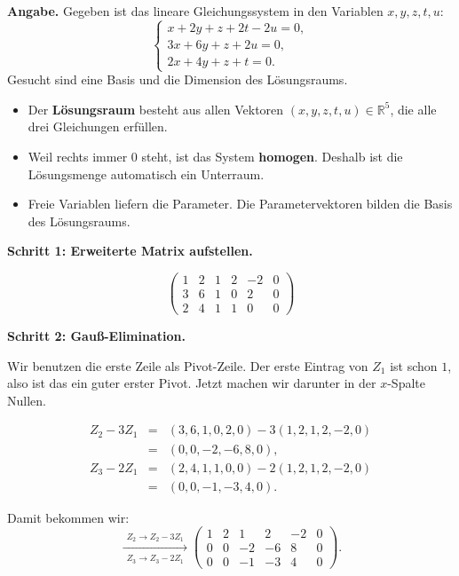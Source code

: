 \documentclass[a4paper,12pt]{article}
\begin{document}
\textbf{Angabe.}
Gegeben ist das lineare Gleichungssystem in den Variablen $x,y,z,t,u$:
\[
\begin{cases}
x+2y+z+2t-2u=0,\\
3x+6y+z+2u=0,\\
2x+4y+z+t=0.
\end{cases}
\]
Gesucht sind eine Basis und die Dimension des L\"osungsraums.

\begin{begriffe}
\begin{itemize}[leftmargin=*, nosep]
    \item Der \textbf{L\"osungsraum} besteht aus allen Vektoren $(x,y,z,t,u)\in\mathbb{R}^5$, die alle drei Gleichungen erf\"ullen.
    \item Weil rechts immer $0$ steht, ist das System \textbf{homogen}. Deshalb ist die L\"osungsmenge automatisch ein Unterraum.
    \item Freie Variablen liefern die Parameter. Die Parametervektoren bilden die Basis des L\"osungsraums.
\end{itemize}
\end{begriffe}

\textbf{Schritt 1: Erweiterte Matrix aufstellen.}

\[
\left(\begin{array}{ccccc|c}
1 & 2 & 1 & 2 & -2 & 0 \\
3 & 6 & 1 & 0 & 2 & 0 \\
2 & 4 & 1 & 1 & 0 & 0
\end{array}\right)
\]

\textbf{Schritt 2: Gau\ss-Elimination.}

Wir benutzen die erste Zeile als Pivot-Zeile. Der erste Eintrag von $Z_1$ ist schon $1$,
also ist das ein guter erster Pivot.
Jetzt machen wir darunter in der $x$-Spalte Nullen.

\[
\begin{array}{rcl}
Z_2-3Z_1
&=&
(3,6,1,0,2,0)-3(1,2,1,2,-2,0) \\
&=&
(0,0,-2,-6,8,0),
\\[4pt]
Z_3-2Z_1
&=&
(2,4,1,1,0,0)-2(1,2,1,2,-2,0) \\
&=&
(0,0,-1,-3,4,0).
\end{array}
\]

Damit bekommen wir:
\[
\xrightarrow[\substack{Z_3\to Z_3-2Z_1}]{Z_2\to Z_2-3Z_1}
\left(\begin{array}{ccccc|c}
1 & 2 & 1 & 2 & -2 & 0 \\
0 & 0 & -2 & -6 & 8 & 0 \\
0 & 0 & -1 & -3 & 4 & 0
\end{array}\right).
\]
\end{document}

